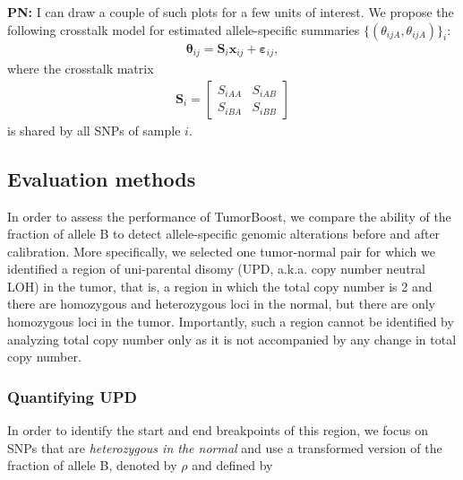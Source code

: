 \documentclass[10pt]{bmc_article}
\newenvironment{bmcformat}{\fussy\setboolean{publ}{true}}{\fussy}
\newcommand{\bx}{\mathbf{x}\xspace}
\newcommand{\bS}{\mathbf{S}\xspace}
\newcommand{\beps}{\bm{\varepsilon}\xspace}
\newcommand{\btheta}{\bm{\theta}\xspace}
\newenvironment{PN}{\color{blue}\textbf{PN:}}{}
\begin{document}
\begin{bmcformat}
\begin{PN}
   I can draw a couple of such plots for a few units of interest.
\end{PN}
We propose the following crosstalk model for estimated allele-specific summaries $\{(\theta_{ijA},\theta_{ijA})\}_i$:
\begin{eqnarray*}
  \btheta_{ij} = \bS_i \bx_{ij} + \beps_{ij},
\end{eqnarray*}
where the crosstalk matrix
\begin{eqnarray*}
 \bS_i = 
 \begin{bmatrix}
   S_{iAA} & S_{iAB} \\
   S_{iBA} & S_{iBB}
 \end{bmatrix}
\end{eqnarray*}
is shared by all SNPs of sample $i$.

\subsection*{Evaluation methods}
\label{secEvaluation}

In order to assess the performance of TumorBoost, we compare the ability of the fraction of allele B to detect allele-specific genomic alterations before and after calibration. More specifically, we selected one tumor-normal pair for which we identified a region of uni-parental disomy (UPD, a.k.a. copy number neutral LOH) in the tumor, that is, a region in which the total copy number is 2 and there are homozygous and heterozygous loci in the normal, but there are only homozygous loci in the tumor. Importantly, such a region cannot be identified by analyzing total copy number only as it is not accompanied by any change in total copy number.

 
\subsubsection*{Quantifying UPD}
In order to identify the start and end breakpoints of this region, we focus on SNPs that are \emph{heterozygous in the normal} and use a transformed version of the fraction of allele B, denoted by $\rho$ and defined by


\end{bmcformat}
\end{document}
